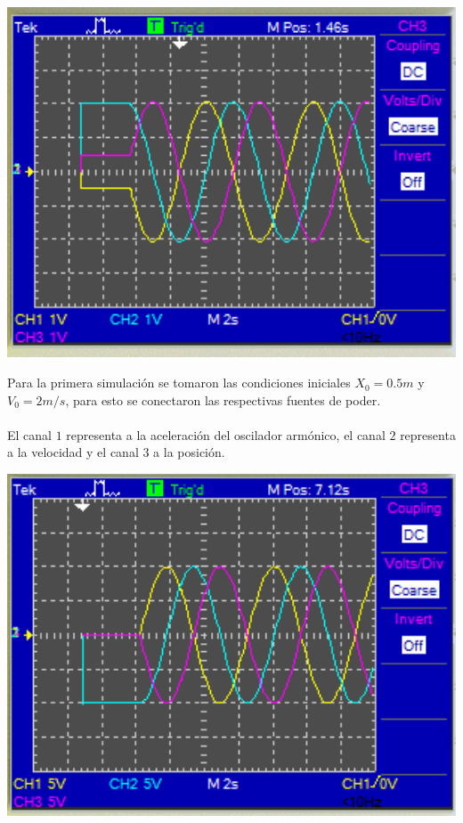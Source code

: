 \documentclass[DIV=calc, paper=a4, fontsize=11pt]{scrartcl}
\newenvironment{Figura}
  {\par\medskip\noindent\minipage{\linewidth}}
  {\endminipage\par\medskip}
\begin{document}
\begin{multicols}{2}
\begin{Figura}
    \centering
    \includegraphics[width=1\textwidth]{Metodologia/SimulacionCondicionIniciales1.png}
    \label{fig}
\end{Figura}

Para la primera simulación se tomaron las condiciones iniciales $X_{0}=0.5m$ y $V_{0}=2m/s$, para esto se conectaron las respectivas fuentes de poder.
\\\\
El canal $1$ representa a la aceleración del oscilador armónico, el canal $2$ representa a la velocidad y el canal $3$ a la posición.


\begin{Figura}
    \centering
    \includegraphics[width=1\textwidth]{Metodologia/SimulacionCondicionIniciales2.png}
    \label{fig}
\end{Figura}


\end{multicols}
\end{document}
